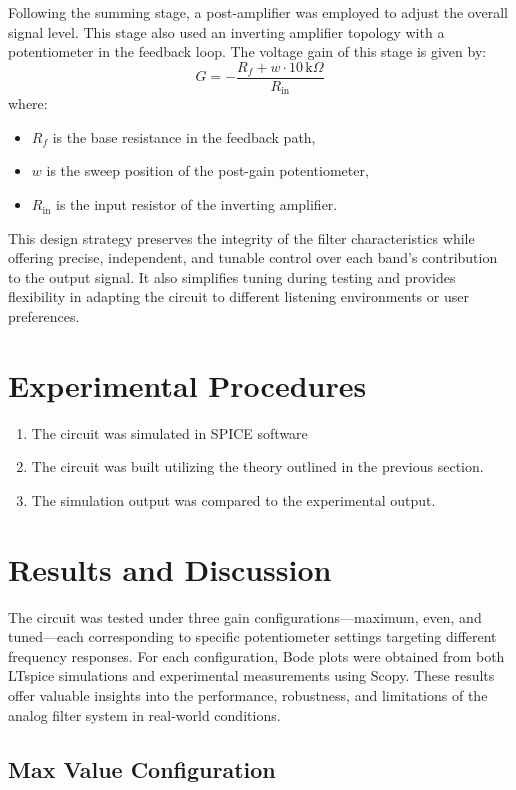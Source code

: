 \documentclass[12pt]{article}
\begin{document}
Following the summing stage, a post-amplifier was employed to adjust the overall signal level. This stage also used an inverting amplifier topology with a potentiometer in the feedback loop. The voltage gain of this stage is given by:
\[
	G = -\frac{R_f + w \cdot 10\,\text{k}\Omega}{R_{\text{in}}}
\]
where:
\begin{itemize}
	\item $R_f$ is the base resistance in the feedback path,
	\item $w$ is the sweep position of the post-gain potentiometer,
	\item $R_{\text{in}}$ is the input resistor of the inverting amplifier.
\end{itemize}

This design strategy preserves the integrity of the filter characteristics while offering precise, independent, and tunable control over each band's contribution to the output signal. It also simplifies tuning during testing and provides flexibility in adapting the circuit to different listening environments or user preferences.
\section{Experimental Procedures}
\begin{enumerate}
	\item The circuit was simulated in SPICE software
	\item The circuit was built utilizing the theory outlined in the previous section.
	\item The simulation output was compared to the experimental output.
\end{enumerate}

\section{Results and Discussion}

The circuit was tested under three gain configurations—maximum, even, and tuned—each corresponding to specific potentiometer settings targeting different frequency responses. For each configuration, Bode plots were obtained from both LTspice simulations and experimental measurements using Scopy. These results offer valuable insights into the performance, robustness, and limitations of the analog filter system in real-world conditions.

\subsection{Max Value Configuration}
\end{document}
